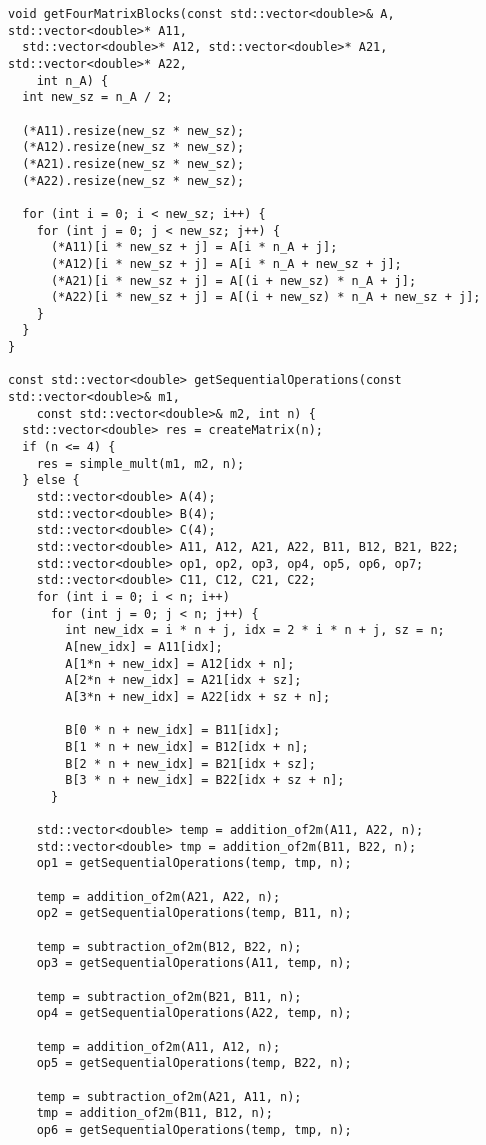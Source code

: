 \documentclass{report}
\begin{document}
\begin{lstlisting}
void getFourMatrixBlocks(const std::vector<double>& A, std::vector<double>* A11,
  std::vector<double>* A12, std::vector<double>* A21, std::vector<double>* A22,
    int n_A) {
  int new_sz = n_A / 2;

  (*A11).resize(new_sz * new_sz);
  (*A12).resize(new_sz * new_sz);
  (*A21).resize(new_sz * new_sz);
  (*A22).resize(new_sz * new_sz);

  for (int i = 0; i < new_sz; i++) {
    for (int j = 0; j < new_sz; j++) {
      (*A11)[i * new_sz + j] = A[i * n_A + j];
      (*A12)[i * new_sz + j] = A[i * n_A + new_sz + j];
      (*A21)[i * new_sz + j] = A[(i + new_sz) * n_A + j];
      (*A22)[i * new_sz + j] = A[(i + new_sz) * n_A + new_sz + j];
    }
  }
}

const std::vector<double> getSequentialOperations(const std::vector<double>& m1,
    const std::vector<double>& m2, int n) {
  std::vector<double> res = createMatrix(n);
  if (n <= 4) {
    res = simple_mult(m1, m2, n);
  } else {
    std::vector<double> A(4);
    std::vector<double> B(4);
    std::vector<double> C(4);
    std::vector<double> A11, A12, A21, A22, B11, B12, B21, B22;
    std::vector<double> op1, op2, op3, op4, op5, op6, op7;
    std::vector<double> C11, C12, C21, C22;
    for (int i = 0; i < n; i++)
      for (int j = 0; j < n; j++) {
        int new_idx = i * n + j, idx = 2 * i * n + j, sz = n;
        A[new_idx] = A11[idx];
        A[1*n + new_idx] = A12[idx + n];
        A[2*n + new_idx] = A21[idx + sz];
        A[3*n + new_idx] = A22[idx + sz + n];

        B[0 * n + new_idx] = B11[idx];
        B[1 * n + new_idx] = B12[idx + n];
        B[2 * n + new_idx] = B21[idx + sz];
        B[3 * n + new_idx] = B22[idx + sz + n];
      }

    std::vector<double> temp = addition_of2m(A11, A22, n);
    std::vector<double> tmp = addition_of2m(B11, B22, n);
    op1 = getSequentialOperations(temp, tmp, n);

    temp = addition_of2m(A21, A22, n);
    op2 = getSequentialOperations(temp, B11, n);

    temp = subtraction_of2m(B12, B22, n);
    op3 = getSequentialOperations(A11, temp, n);

    temp = subtraction_of2m(B21, B11, n);
    op4 = getSequentialOperations(A22, temp, n);

    temp = addition_of2m(A11, A12, n);
    op5 = getSequentialOperations(temp, B22, n);

    temp = subtraction_of2m(A21, A11, n);
    tmp = addition_of2m(B11, B12, n);
    op6 = getSequentialOperations(temp, tmp, n);


\end{lstlisting}
\end{document}
